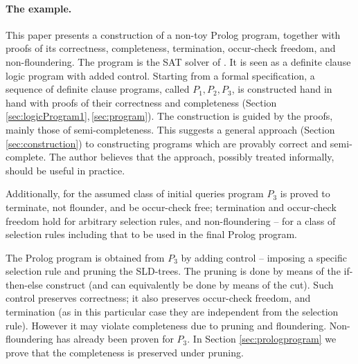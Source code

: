 \documentclass{tlp}
\begin{document}
\paragraph{The example.}
This paper presents a construction of a non-toy Prolog program,
together with proofs of its correctness, completeness,
termination, occur-check freedom, and non-floundering.
The program is the SAT solver of .  
It is seen as a definite clause logic program with added control.
Starting from a formal specification, a 
sequence of definite clause programs, called $P_1,P_2,P_3$,
is constructed hand in hand with proofs of their correctness and completeness 
(Section \ref{sec:logicProgram1},\,\ref{sec:program}).
The construction is guided by the proofs, mainly those of semi-completeness.
This suggests a general approach (Section \ref{sec:construction})
to constructing programs which are provably correct and semi-complete.
The author believes that the approach, possibly treated informally,
should be useful in practice.


Additionally, for the assumed class of initial queries
program $P_3$ is proved to terminate, not flounder, and be occur-check free;
  termination and occur-check freedom hold for arbitrary selection rules,
  and non-floundering -- for a class of selection rules including that to be
  used in the final Prolog program.







The Prolog program is obtained from $P_3$ by adding control --
imposing a specific selection rule and pruning the SLD-trees.
The pruning is done by means of the if-then-else
construct (and can equivalently be done by means of the cut).
Such control preserves correctness; it also preserves 
occur-check freedom, and termination 
(as in this particular case they are independent from the selection rule).
However it may violate completeness due to pruning 
and floundering.  Non-floundering has already been proven for $P_3$.
In Section \ref{sec:prologprogram} 
we prove that the completeness is preserved under pruning.
\end{document}
